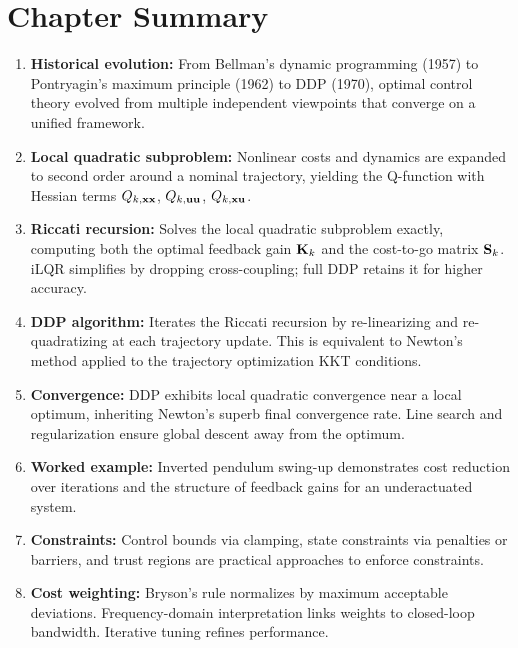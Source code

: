 \section{Chapter Summary}

\begin{enumerate}
\item \textbf{Historical evolution:} From Bellman's dynamic programming (1957) to Pontryagin's maximum principle (1962)
      to DDP (1970), optimal control theory evolved from multiple independent viewpoints that converge on a unified
      framework.

\item \textbf{Local quadratic subproblem:} Nonlinear costs and dynamics are expanded to second order around a nominal
      trajectory, yielding the Q-function with Hessian terms $Q_{k,\mathbf{x}\mathbf{x}}$, $Q_{k,\mathbf{u}\mathbf{u}}$, $Q_{k,\mathbf{x}\mathbf{u}}$.

\item \textbf{Riccati recursion:} Solves the local quadratic subproblem exactly, computing both the optimal feedback
      gain $\mathbf{K}_k$ and the cost-to-go matrix $\mathbf{S}_k$. iLQR simplifies by dropping cross-coupling; full DDP
      retains it for higher accuracy.

\item \textbf{DDP algorithm:} Iterates the Riccati recursion by re-linearizing and re-quadratizing at each trajectory
      update. This is equivalent to Newton's method applied to the trajectory optimization KKT conditions.

\item \textbf{Convergence:} DDP exhibits local quadratic convergence near a local optimum, inheriting Newton's superb
      final convergence rate. Line search and regularization ensure global descent away from the optimum.

\item \textbf{Worked example:} Inverted pendulum swing-up demonstrates cost reduction over iterations and the structure
      of feedback gains for an underactuated system.

\item \textbf{Constraints:} Control bounds via clamping, state constraints via penalties or barriers, and trust regions
      are practical approaches to enforce constraints.

\item \textbf{Cost weighting:} Bryson's rule normalizes by maximum acceptable deviations. Frequency-domain interpretation
      links weights to closed-loop bandwidth. Iterative tuning refines performance.


\end{enumerate}
